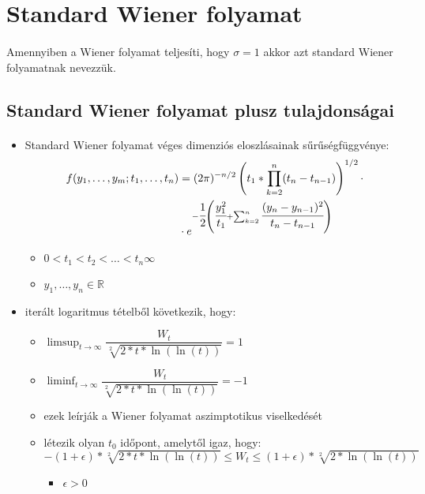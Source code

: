 \documentclass[11pt,a4paper]{article}
\begin{document}
			\section{Standard Wiener folyamat}
				\paragraph{}
					Amennyiben a Wiener folyamat teljesíti, hogy $\sigma = 1$ akkor azt standard Wiener folyamatnak nevezzük.
			\subsection{Standard Wiener folyamat plusz tulajdonságai}
				\paragraph{}
					\begin{itemize}
						\item Standard Wiener folyamat véges dimenziós eloszlásainak sűrűségfüggvénye: 
						$$\begin{aligned}
							f(y_1, \dots, y_m; t_1, \dots , t_n) &= (2\pi)^{-n/2}\left(t_1*\prod_{k=2}^n(t_n-t_{n-1}) \right)^{1/2} \cdot \\
							&\cdot e^{-\cfrac{1}{2} \left( \cfrac{y_1^2}{t_1}+\sum_{k=2}^n \cfrac{(y_n-y_{n-1})^2}{t_n - t_{n-1}} \right)}
						\end{aligned}$$
						\begin{itemize}
							\item $0 < t_1 < t_2 < \dots < t_n \infty$
							\item $y_1, \dots, y_n \in \mathbb{R}$ 
						\end{itemize}
						\item iterált logaritmus tételből következik, hogy:
						\begin{itemize}
							\item $\limsup_{t \to \infty} \dfrac{W_t}{\sqrt[2]{2*t*\ln(\ln(t))}}=1$
							\item $\liminf_{t \to \infty} \dfrac{W_t}{\sqrt[2]{2*t*\ln(\ln(t))}}=-1$
							\item ezek leírják a Wiener folyamat aszimptotikus viselkedését
							\item létezik olyan $t_0$ időpont, amelytől igaz, hogy: $-(1+ \epsilon)*\sqrt[2]{2*t*\ln(\ln(t))} \le W_t \le (1+ \epsilon)*\sqrt[2]{2*\ln(\ln(t))}$
							\begin{itemize}
								\item $\epsilon > 0$
							\end{itemize}
						\end{itemize}
					\end{itemize}
\end{document}
